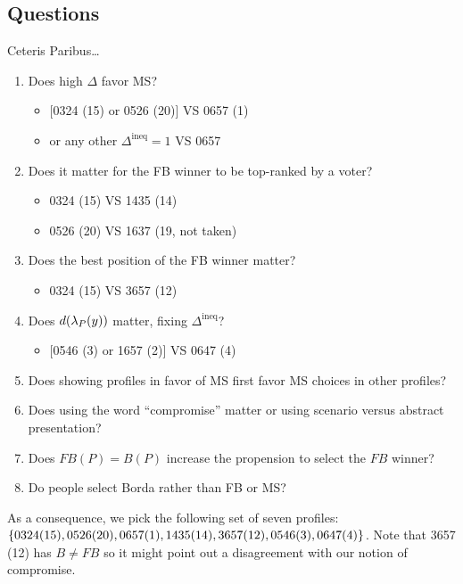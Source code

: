 \documentclass[pagesize, twoside=off, bibliography=totoc, DIV=calc, fontsize=12pt, a4paper]{scrartcl}
\begin{document}
\subsection{Questions}
Ceteris Paribus…
\begin{enumerate}
	\item Does high $\Delta$ favor MS?
	\begin{itemize}
		\item {}[0324 (15) or 0526 (20)] VS 0657 (1)
		\item or any other $\Delta^\text{ineq} = 1$ VS 0657
	\end{itemize}
	\item Does it matter for the FB winner to be top-ranked by a voter? 
	\begin{itemize}
		\item 0324 (15) VS 1435 (14)
		\item 0526 (20) VS 1637 (19, not taken)
	\end{itemize}
	\item Does the best position of the FB winner matter?
	\begin{itemize}
		\item 0324 (15) VS 3657 (12)
	\end{itemize}
	\item Does $d(\lambda_P(y))$ matter, fixing $\Delta^\text{ineq}$?
	\begin{itemize}
		\item{} [0546 (3) or 1657 (2)] VS 0647 (4)
	\end{itemize}
	\item Does showing profiles in favor of MS first favor MS choices in other profiles?
	\item Does using the word “compromise” matter or using scenario  versus abstract presentation?
	\item Does $FB(P) = B(P)$ increase the propension to select the $FB$ winner?
	\item Do people select Borda rather than FB or MS?
\end{enumerate}
As a consequence, we pick the following set of seven profiles: $\{0324 (15), 0526 (20), 0657 (1), \allowbreak 1435 (14), \allowbreak 3657 (12), \allowbreak 0546 (3), 0647 (4)\}$.
Note that 3657 (12) has $B ≠ FB$ so it might point out a disagreement with our notion of compromise.
\end{document}
